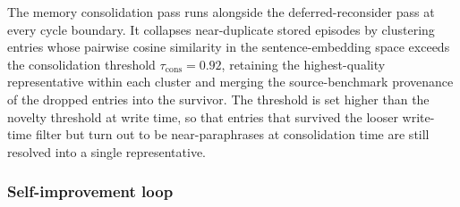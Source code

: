 The memory consolidation pass runs alongside the deferred-reconsider pass at every cycle boundary. It collapses near-duplicate stored episodes by clustering entries whose pairwise cosine similarity in the sentence-embedding space exceeds the consolidation threshold $\tau_{\text{cons}} = 0.92$, retaining the highest-quality representative within each cluster and merging the source-benchmark provenance of the dropped entries into the survivor. The threshold is set higher than the novelty threshold at write time, so that entries that survived the looser write-time filter but turn out to be near-paraphrases at consolidation time are still resolved into a single representative.

\subsubsection{Self-improvement loop}
\label{sec:sil}

